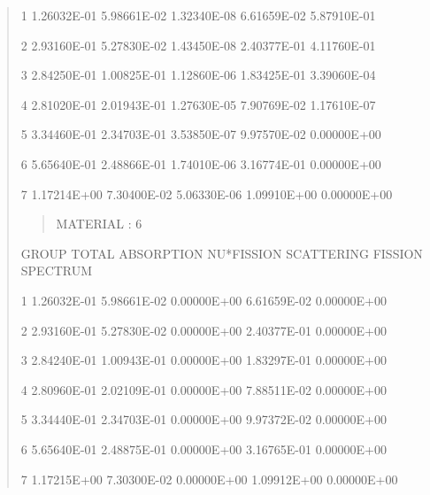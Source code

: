 \documentclass[letterpaper,10pt,english]{sphinxmanual}
\begin{document}
\begin{quote}
\begin{DUlineblock}{0em}
\item[] 1          1.26032E-01     5.98661E-02     1.32340E-08     6.61659E-02     5.87910E-01           \textbar{}
\item[] 2          2.93160E-01     5.27830E-02     1.43450E-08     2.40377E-01     4.11760E-01           \textbar{}
\item[] 3          2.84250E-01     1.00825E-01     1.12860E-06     1.83425E-01     3.39060E-04           \textbar{}
\item[] 4          2.81020E-01     2.01943E-01     1.27630E-05     7.90769E-02     1.17610E-07           \textbar{}
\item[] 5          3.34460E-01     2.34703E-01     3.53850E-07     9.97570E-02     0.00000E+00           \textbar{}
\item[] 6          5.65640E-01     2.48866E-01     1.74010E-06     3.16774E-01     0.00000E+00           \textbar{}
\item[] 7          1.17214E+00     7.30400E-02     5.06330E-06     1.09910E+00     0.00000E+00           \textbar{}
\end{DUlineblock}
\begin{quote}

MATERIAL :   6
\end{quote}

\begin{DUlineblock}{0em}
\item[] GROUP           TOTAL        ABSORPTION      NU*FISSION      SCATTERING      FISSION SPECTRUM       \textbar{}
\end{DUlineblock}

\begin{DUlineblock}{0em}
\item[] 1          1.26032E-01     5.98661E-02     0.00000E+00     6.61659E-02     0.00000E+00           \textbar{}
\item[] 2          2.93160E-01     5.27830E-02     0.00000E+00     2.40377E-01     0.00000E+00           \textbar{}
\item[] 3          2.84240E-01     1.00943E-01     0.00000E+00     1.83297E-01     0.00000E+00           \textbar{}
\item[] 4          2.80960E-01     2.02109E-01     0.00000E+00     7.88511E-02     0.00000E+00           \textbar{}
\item[] 5          3.34440E-01     2.34703E-01     0.00000E+00     9.97372E-02     0.00000E+00           \textbar{}
\item[] 6          5.65640E-01     2.48875E-01     0.00000E+00     3.16765E-01     0.00000E+00           \textbar{}
\item[] 7          1.17215E+00     7.30300E-02     0.00000E+00     1.09912E+00     0.00000E+00           \textbar{}
\end{DUlineblock}
\begin{quote}


\end{quote}
\end{quote}
\end{document}
